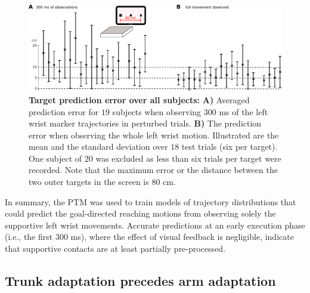 \begin{figure}[t]
\centering
\includegraphics[width=\textwidth]{Elmar/picsClean/SubFigPredError9DoF}
 \caption{\textbf{Target prediction error over all subjects:} 
 \textbf{A)} Averaged prediction error for $19$ subjects when observing $300$ ms of the left wrist marker trajectories in perturbed trials. 
 \textbf{B)} The prediction error when observing the whole left wrist motion. Illustrated are the mean and the 
 standard deviation over $18$ test trials (six per target). One subject of $20$ was excluded as less than six trials per target were recorded. 
 Note that the maximum error or the distance between the two outer targets in the screen is $80$ cm.
 }
\label{fig:subFigPerdErrorAllSubjects}
\end{figure}

In summary, the PTM was used to train models of trajectory distributions that 
could predict the goal-directed reaching motions from observing solely the 
supportive left wrist movements. Accurate predictions at an early execution 
phase (i.e., the first $300$ ms), where the effect of visual feedback is 
negligible, indicate that supportive contacts are at least partially 
pre-processed. 


\subsection{Trunk adaptation precedes arm adaptation}

